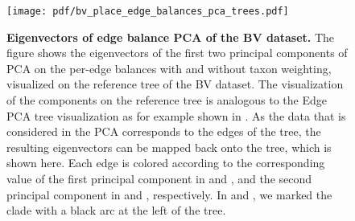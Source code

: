 \begin{figure}[!phtb]
    \centering
    \texttt{[image: pdf/bv\_place\_edge\_balances\_pca\_trees.pdf]}
    \begin{subfigure}{0pt}
        \label{fig:bv_place_edge_balances_pca_trees:sub:tw_pc1}
    \end{subfigure}
    \begin{subfigure}{0pt}
        \label{fig:bv_place_edge_balances_pca_trees:sub:tw_pc2}
    \end{subfigure}
    \begin{subfigure}{0pt}
        \label{fig:bv_place_edge_balances_pca_trees:sub:no_tw_pc1}
    \end{subfigure}
    \begin{subfigure}{0pt}
        \label{fig:bv_place_edge_balances_pca_trees:sub:no_tw_pc2}
    \end{subfigure}
    \caption[Eigenvectors of edge balance PCA of the \acs{BV} dataset]{
        \textbf{Eigenvectors of edge balance PCA of the \ac{BV} dataset.}
        The figure shows the eigenvectors of the first two principal components of PCA
        on the per-edge balances with and without taxon weighting,
        visualized on the reference tree of the \ac{BV} dataset.
        The visualization of the components on the reference tree is analogous
        to the Edge PCA tree visualization as for example shown in .
        As the data that is considered in the PCA corresponds to the edges of the tree,
        the resulting eigenvectors can be mapped back onto the tree, which is shown here.
        Each edge is colored according to the corresponding value of the first principal component
        in 
        and ,
        and the second principal component
        in 
        and , respectively.
        In 
        and ,
        we marked the  clade with a black arc at the left of the tree.
    }
    \label{fig:bv_place_edge_balances_pca_trees}
\end{figure}

